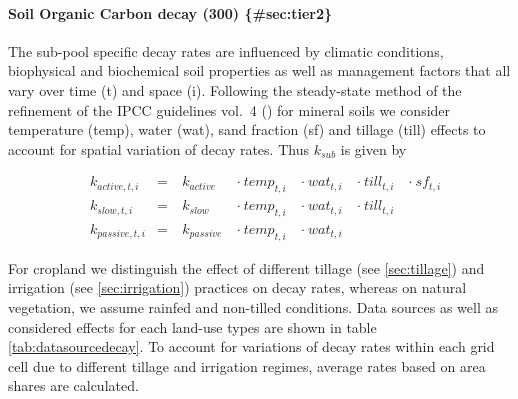 \documentclass[gc, manuscript]{copernicus}
\begin{document}
\hypertarget{soil-organic-carbon-decay-300-sectier2}{%
\paragraph*{Soil Organic Carbon decay (300) \{\#sec:tier2\}}\label{soil-organic-carbon-decay-300-sectier2}}

The sub-pool specific decay rates are influenced by climatic conditions, biophysical and biochemical soil properties as well as management factors that all vary over time (t) and space (i). Following the steady-state method of the refinement of the IPCC guidelines vol.~4 (\citep{ipcc_2019_2019}) for mineral soils we consider temperature (temp), water (wat), sand fraction (sf) and tillage (till) effects to account for spatial variation of decay rates. Thus \(k_{sub}\) is given by

\begin{equation}
\begin{aligned}
& k_{active,t,i}  & = &~ k_{active}  ~ &\cdot~ temp_{t,i} ~ &\cdot~ wat_{t,i} ~ &\cdot~ till_{t,i} ~ & \cdot~ sf_{t,i}\\
& k_{slow,t,i}    & = &~ k_{slow}    ~ &\cdot~ temp_{t,i} ~ &\cdot~ wat_{t,i} ~ &\cdot~ till_{t,i} ~ &\\
& k_{passive,t,i} & = &~ k_{passive} ~ &\cdot~ temp_{t,i} ~ &\cdot~ wat_{t,i} ~ & ~ &
\label{eq:decayrates}
\end{aligned}
\end{equation}

For cropland we distinguish the effect of different tillage (see \ref{sec:tillage}) and irrigation (see \ref{sec:irrigation}) practices on decay rates, whereas on natural vegetation, we assume rainfed and non-tilled conditions. Data sources as well as considered effects for each land-use types are shown in table \ref{tab:datasourcedecay}. To account for variations of decay rates within each grid cell due to different tillage and irrigation regimes, average rates based on area shares are calculated.
\end{document}
